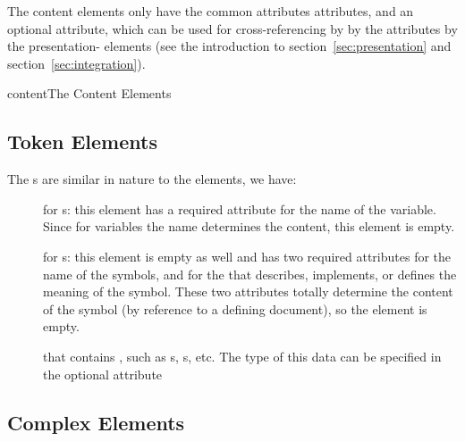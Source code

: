 The {\codeml} content elements only have the common {\codeml}
attributes attributes, and an
optional {} attribute, which can be used for
cross-referencing by by the {} attributes by the
presentation-{\codeml} elements (see the introduction to
section~\ref{sec:presentation} and section~\ref{sec:integration}).

\begin{myfig}{content}{The {\codeml} Content Elements}
  \quicktable{\contenttable{}}
\end{myfig}

\subsection{Token Elements}\label{sec:content:token}

The {\codeml} {s} are similar in
nature to the {\openmath} elements, we have:
\begin{description}
\item[{}] for {s}: this element has a required
  attribute {} for the name of the variable. Since for
  variables the name determines the content, this element is empty.
\item[{}] for {s}:
  this element is empty as well and has two required attributes
  {} for the name of the symbols, and
  {} for the {} that describes, implements, or
  defines the meaning of the symbol.  These two attributes totally determine the
  content of the symbol (by reference to a defining document), so the {} element is
  empty.
\item[{}] that contains {},
  such as {s}, {s}, etc. The type of this data
  can be specified in the optional attribute {}
\end{description}

\subsection{Complex Elements}\label{sec:content:complex}

